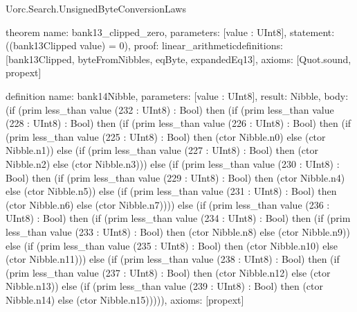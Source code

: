 \begin{lexlean}{Uorc.Search.UnsignedByteConversionLaws}
\begin{semanticmodule}
theorem{
  name: bank13_clipped_zero,
  parameters: [value : UInt8],
  statement: ((bank13Clipped value) = 0),
  proof: linear_arithmetic{definitions: [bank13Clipped, byteFromNibbles, eqByte, expandedEq13]},
  axioms: [Quot.sound, propext]
}

definition{
  name: bank14Nibble,
  parameters: [value : UInt8],
  result: Nibble,
  body: (if (prim less_than value (232 : UInt8) : Bool) then (if (prim less_than value (228 : UInt8) : Bool) then (if (prim less_than value (226 : UInt8) : Bool) then (if (prim less_than value (225 : UInt8) : Bool) then (ctor Nibble.n0) else (ctor Nibble.n1)) else (if (prim less_than value (227 : UInt8) : Bool) then (ctor Nibble.n2) else (ctor Nibble.n3))) else (if (prim less_than value (230 : UInt8) : Bool) then (if (prim less_than value (229 : UInt8) : Bool) then (ctor Nibble.n4) else (ctor Nibble.n5)) else (if (prim less_than value (231 : UInt8) : Bool) then (ctor Nibble.n6) else (ctor Nibble.n7)))) else (if (prim less_than value (236 : UInt8) : Bool) then (if (prim less_than value (234 : UInt8) : Bool) then (if (prim less_than value (233 : UInt8) : Bool) then (ctor Nibble.n8) else (ctor Nibble.n9)) else (if (prim less_than value (235 : UInt8) : Bool) then (ctor Nibble.n10) else (ctor Nibble.n11))) else (if (prim less_than value (238 : UInt8) : Bool) then (if (prim less_than value (237 : UInt8) : Bool) then (ctor Nibble.n12) else (ctor Nibble.n13)) else (if (prim less_than value (239 : UInt8) : Bool) then (ctor Nibble.n14) else (ctor Nibble.n15))))),
  axioms: [propext]
}


\end{semanticmodule}
\end{lexlean}
